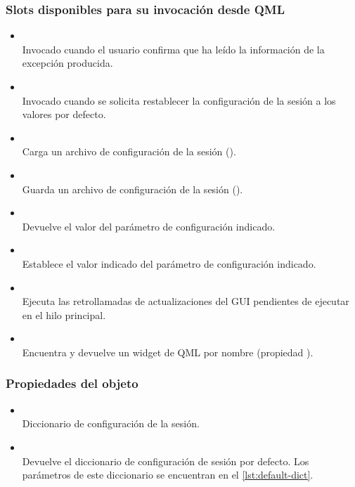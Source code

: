 \subsubsection{Slots disponibles para su invocación desde QML}

\begin{itemize}
\item {}\\
Invocado cuando el usuario confirma que ha leído la información de la excepción producida.
\item {}\\
Invocado cuando se solicita restablecer la configuración de la sesión a los valores por defecto.
\item {}\\
Carga un archivo de configuración de la sesión ().
\item {}\\
Guarda un archivo de configuración de la sesión ().
\item {}\\
Devuelve el valor del parámetro de configuración indicado.
\item {}\\
Establece el valor indicado del parámetro de configuración indicado.
\item {}\\
Ejecuta las retrollamadas de actualizaciones del GUI pendientes de ejecutar en el hilo principal.
\item {}\\
Encuentra y devuelve un widget de QML por nombre (propiedad ).
\end{itemize}

\subsubsection{Propiedades del objeto}

\begin{itemize}
\item {}\\
Diccionario de configuración de la sesión.
\item {}\\
Devuelve el diccionario de configuración de sesión por defecto. Los parámetros de este diccionario se encuentran en el \autoref{lst:default-dict}.
\end{itemize}

